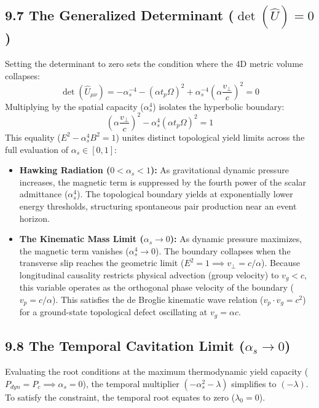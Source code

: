 \subsection*{9.7 The Generalized Determinant ($\det(\hat{U}) = 0$)} %
Setting the determinant to zero sets the condition where the 4D metric volume collapses: 
\begin{equation} 
    \det(\hat{U}_{\mu\nu}) = -\alpha_s^{-4} - (\alpha t_p \Omega)^2 + \alpha_s^{-4} \left(\alpha \frac{v_\perp}{c}\right)^2 = 0 
\end{equation}
Multiplying by the spatial capacity ($\alpha_s^4$) isolates the hyperbolic boundary: 
\begin{equation} 
    \left(\alpha \frac{v_\perp}{c}\right)^2 - \alpha_s^4 (\alpha t_p \Omega)^2 = 1 \label{eq:generalized_cavitation} 
\end{equation} 
This equality ($E^2 - \alpha_s^4 B^2 = 1$) unites distinct topological yield limits across the full evaluation of $\alpha_s \in [0, 1]$: 
\begin{itemize} 
     \item \textbf{Hawking Radiation ($0 < \alpha_s < 1$):} As gravitational dynamic pressure increases, the magnetic term is suppressed by the fourth power of the scalar admittance ($\alpha_s^4$). The topological boundary yields at exponentially lower energy thresholds, structuring spontaneous pair production near an event horizon. 
    \item \textbf{The Kinematic Mass Limit ($\alpha_s \to 0$):} As dynamic pressure maximizes, the magnetic term vanishes ($\alpha_s^4 \to 0$). The boundary collapses when the transverse slip reaches the geometric limit ($E^2 = 1 \implies v_\perp = c/\alpha$). Because longitudinal causality restricts physical advection (group velocity) to $v_g < c$, this variable operates as the orthogonal phase velocity of the boundary ($v_p = c/\alpha$). This satisfies the de Broglie kinematic wave relation ($v_p \cdot v_g = c^2$) for a ground-state topological defect oscillating at $v_g = \alpha c$. 
\end{itemize} 

\subsection*{9.8 The Temporal Cavitation Limit ($\alpha_s \to 0$)} 
Evaluating the root conditions at the maximum thermodynamic yield capacity ($P_{dyn} = P_c \implies \alpha_s = 0$), the temporal multiplier $(-\alpha_s^2 - \lambda)$ simplifies to $(-\lambda)$. To satisfy the constraint, the temporal root equates to zero ($\lambda_0 = 0$). 

